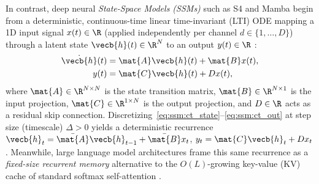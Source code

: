 \documentclass[../../../../master.tex]{subfiles}
\begin{document}
In contrast, deep neural \emph{State-Space Models (SSMs)} such as S4 and Mamba begin from a deterministic, continuous-time linear time-invariant (LTI) ODE mapping a 1D input signal $x(t) \in \R$ (applied independently per channel $d \in \{1,\dots,D\}$) through a latent state $\vecb{h}(t) \in \R^N$ to an output $y(t) \in \R$ :
\begin{align}
  \dot{\vecb{h}}(t) &= \mat{A}\vecb{h}(t) + \mat{B}x(t), \label{eq:ssm:ct_state} \\
  y(t) &= \mat{C}\vecb{h}(t) + Dx(t), \label{eq:ssm:ct_out}
\end{align}
where $\mat{A} \in \R^{N \times N}$ is the state transition matrix, $\mat{B} \in \R^{N \times 1}$ is the input projection, $\mat{C} \in \R^{1 \times N}$ is the output projection, and $D \in \R$ acts as a residual skip connection. Discretizing~\eqref{eq:ssm:ct_state}--\eqref{eq:ssm:ct_out} at step size (timescale) $\Delta > 0$ yields a deterministic recurrence $\vecb{h}_t = \bar{\mat{A}}\vecb{h}_{t-1} + \bar{\mat{B}}x_t$, $y_t = \mat{C}\vecb{h}_t + Dx_t$ . Meanwhile, large language model architectures frame this same recurrence as a \emph{fixed-size recurrent memory} alternative to the $O(L)$-growing key-value (KV) cache of standard softmax self-attention .
\end{document}
